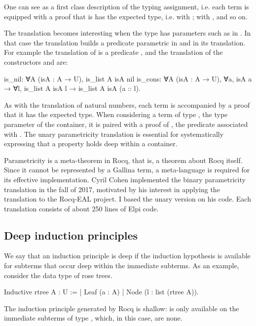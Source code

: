 \documentclass[a4paper, 11pt]{book}
\begin{document}
One can see  as a first class description of the
typing assignment, i.e. each term is equipped with a proof that
is has the expected type, i.e.  with ;
 with , and so on.

The translation becomes interesting when the type has parameters such as
 in . In that case the translation builds
a predicate parametric in  and in its translation. For example
the translation of  is a predicate
,
and the translation of the constructors  and 
are:
\begin{rocqcode}
is_nil: ∀A (isA : A → U), is_list A isA nil
is_cons: ∀A (isA : A → U), ∀a, isA a → 
  ∀l, is_list A isA l → is_list A isA (a :: l).
\end{rocqcode}


As with the translation of natural numbers, each term is accompanied by a proof
that it has the expected type. When considering a term  of
type , the type parameter of the container, it is paired with a proof of
, the predicate associated with . The unary parametricity
translation is essential for systematically expressing that a property holds deep
within a container.

Parametricity is a meta-theorem in Rocq, that is, a theorem about Rocq itself.
Since it cannot be represented by a Gallina term, a meta-language is required for
its effective implementation. Cyril Cohen implemented the binary parametricity
translation in the fall of 2017, motivated by his interest in applying the
translation to the Rocq-EAL project. I based the unary version on his code. Each
translation consists of about 250 lines of Elpi code.

\subsection{Deep induction principles}


We say that an induction principle is deep if the induction hypothesis is
available for subterms that occur deep within the immediate subterms. As an
example, consider the data type of rose trees.

\begin{rocqcode}
Inductive rtree A : U :=
| Leaf (a : A)
| Node (l : list (rtree A)).
\end{rocqcode}

The induction principle generated by Rocq is shallow:  is only
available on the immediate subterms of type , which, in this case,
are none.
\end{document}
